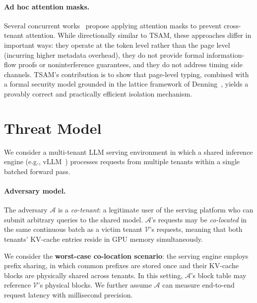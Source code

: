 \documentclass[11pt]{article}
\begin{document}
\paragraph{Ad hoc attention masks.}
Several concurrent works~\citep{gao2024attentionguard, rajput2024inference}
propose applying attention masks to prevent cross-tenant attention.  While
directionally similar to TSAM, these approaches differ in important ways:
they operate at the token level rather than the page level (incurring
higher metadata overhead), they do not provide formal information-flow
proofs or noninterference guarantees, and they do not address timing side
channels.  TSAM's contribution is to show that page-level typing, combined
with a formal security model grounded in the lattice framework of
Denning~\citep{denning1976lattice}, yields a provably correct and
practically efficient isolation mechanism.

\section{Threat Model}
\label{sec:threat}

We consider a multi-tenant LLM serving environment in which a shared inference engine (e.g., vLLM~\citep{kwon2023vllm}) processes requests from multiple tenants within a single batched forward pass.

\paragraph{Adversary model.}
The adversary $\mathcal{A}$ is a \emph{co-tenant}: a legitimate user of the serving platform who can submit arbitrary queries to the shared model. $\mathcal{A}$'s requests may be \emph{co-located} in the same continuous batch as a victim tenant $\mathcal{V}$'s requests, meaning that both tenants' KV-cache entries reside in GPU memory simultaneously.

We consider the \textbf{worst-case co-location scenario}: the serving engine employs prefix sharing, in which common prefixes are stored once and their KV-cache blocks are physically shared across tenants. In this setting, $\mathcal{A}$'s block table may reference $\mathcal{V}$'s physical blocks. We further assume $\mathcal{A}$ can measure end-to-end request latency with millisecond precision.
\end{document}
